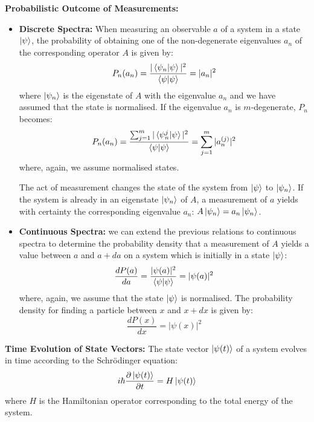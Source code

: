 \begin{postulate}
    \textbf{Probabilistic Outcome of Measurements:}
    \begin{itemize}
        \item \textbf{Discrete Spectra:} When measuring an observable $a$ of a system in a state $\ket{\psi}$, the probability of obtaining one of the non-degenerate eigenvalues $a_n$ of the corresponding operator $A$ is given by:
        \begin{equation}
            P_n(a_n) = \frac{|\braket{\psi_n|\psi}|^2}{\braket{\psi|\psi}} = |a_n|^2
        \end{equation}
        where $\ket{\psi_n}$ is the eigenstate of $A$ with the eigenvalue $a_n$ and we have assumed that the state is normalised. If the eigenvalue $a_n$ is $m$-degenerate, $P_n$ becomes:
        \begin{equation}
            P_n(a_n) = \frac{\sum_{j=1}^m|\braket{\psi_n^j|\psi}|^2}{\braket{\psi|\psi}} = \sum_{j=1}^m |a_n^{(j)}|^2
        \end{equation}
        where, again, we assume normalised states.

        The act of measurement changes the state of the system from $\ket{\psi}$ to $\ket{\psi_n}$. If the system is already in an eigenstate $\ket{\psi_n}$ of $A$, a measurement of $a$ yields with certainty the corresponding eigenvalue $a_n$: $A\ket{\psi_n} = a_n\ket{\psi_n}$.
        \item \textbf{Continuous Spectra:} we can extend the previous relations to continuous spectra to determine the probability density that a measurement of $A$ yields a value between $a$ and $a + da$ on a system which is initially in a state $\ket{\psi}$:
        \begin{equation}
            \frac{dP(a)}{da} = \frac{|\psi(a)|^2}{\braket{\psi|\psi}} = |\psi(a)|^2
        \end{equation}
        where, again, we assume that the state $\ket{\psi}$ is normalised. The probability density for finding a particle between $x$ and $x + dx$ is given by:
        \begin{equation}
            \frac{dP(x)}{dx} = |\psi(x)|^2
        \end{equation}
    \end{itemize}
\end{postulate}

\begin{postulate}
    \textbf{Time Evolution of State Vectors:} The state vector $\ket{\psi(t)}$ of a system evolves in time according to the Schrödinger equation:
    \begin{equation}
        i\hbar\frac{\partial \ket{\psi(t)}}{\partial t} = H\ket{\psi(t)}
    \end{equation}
    where $H$ is the Hamiltonian operator corresponding to the total energy of the system.
\end{postulate}

